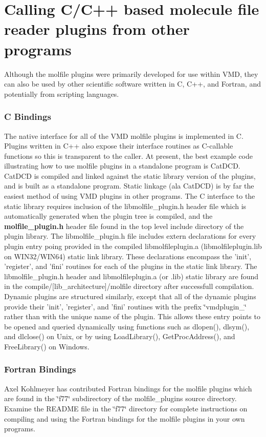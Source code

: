 \section{Calling C/C++ based molecule file reader plugins from other programs}\label{callmolfileplugins}


Although the molfile plugins were primarily developed for use within VMD, they can also be used by other scientific software written in C, C++, and Fortran, and potentially from scripting languages.

\subsubsection*{C Bindings}
 The native interface for all of the VMD molfile plugins is implemented in C. Plugins written in C++ also expose their interface routines as C-callable functions so this is transparent to the caller. At present, the best example code illustrating how to use molfile plugins in a standalone program is Cat\-DCD. Cat\-DCD is compiled and linked against the static library version of the plugins, and is built as a standalone  program. Static linkage (ala Cat\-DCD) is by far the easiest method of using VMD plugins in other programs. The C interface to the static library requires inclusion of the libmolfile\_\-plugin.h header file which is automatically generated when the plugin tree is compiled, and the  {\bf molfile\_\-plugin.h} header file found in the top level include directory of the plugin library. The libmolfile\_\-plugin.h file includes  extern declarations for every plugin entry poing provided in the compiled libmolfileplugin.a (libmolfileplugin.lib on WIN32/WIN64)  static link library. These declarations encompass the  'init', 'register', and 'fini' routines for each of the plugins  in the static link library. The libmolfile\_\-plugin.h header and libmolfileplugin.a (or .lib) static library are found in the  compile/[lib\_\-architecture]/molfile directory after successfull compilation. Dynamic plugins are structured similarly, except that all of the dynamic plugins provide their 'init', 'register', and 'fini' routines with the prefix \char`\"{}vmdplugin\_\-\char`\"{} rather than with the unique name of the plugin. This allows these entry points to  be opened and queried dynamically using functions such as dlopen(), dlsym(), and dlclose() on Unix, or by using Load\-Library(), Get\-Proc\-Address(), and Free\-Library() on Windows.

\subsubsection*{Fortran Bindings}
 Axel Kohlmeyer has contributed Fortran bindings for the molfile  plugins which are found in the \char`\"{}f77\char`\"{} subdirectory of the molfile\_\-plugins source directory. Examine the README file in the \char`\"{}f77\char`\"{} directory for complete instructions on compiling and using the Fortran bindings for the molfile plugins in your own programs.


